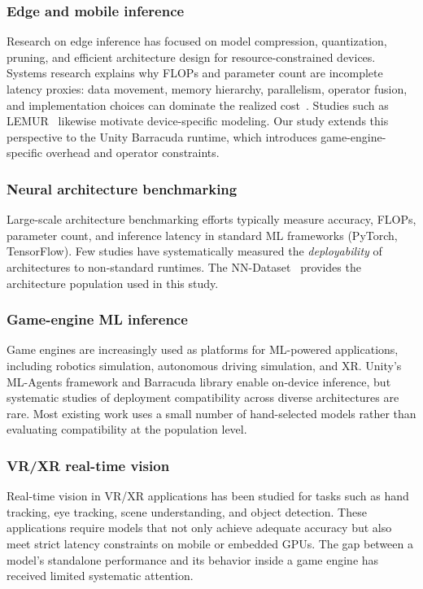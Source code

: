 \documentclass[10pt,twocolumn]{article}
\begin{document}
\subsubsection{Edge and mobile inference}

Research on edge inference has focused on model compression, quantization, pruning, and efficient architecture design for resource-constrained devices. Systems research explains why FLOPs and parameter count are incomplete latency proxies: data movement, memory hierarchy, parallelism, operator fusion, and implementation choices can dominate the realized cost~\cite{sze2017efficient}. Studies such as LEMUR~\cite{ABrain.LEMUR2} likewise motivate device-specific modeling. Our study extends this perspective to the Unity Barracuda runtime, which introduces game-engine-specific overhead and operator constraints.

\subsubsection{Neural architecture benchmarking}

Large-scale architecture benchmarking efforts typically measure accuracy, FLOPs, parameter count, and inference latency in standard ML frameworks (PyTorch, TensorFlow). Few studies have systematically measured the \emph{deployability} of architectures to non-standard runtimes. The NN-Dataset~\cite{ABrain.NN-Dataset} provides the architecture population used in this study.

\subsubsection{Game-engine ML inference}

Game engines are increasingly used as platforms for ML-powered applications, including robotics simulation, autonomous driving simulation, and XR. Unity's ML-Agents framework and Barracuda library enable on-device inference, but systematic studies of deployment compatibility across diverse architectures are rare. Most existing work uses a small number of hand-selected models rather than evaluating compatibility at the population level.

\subsubsection{VR/XR real-time vision}

Real-time vision in VR/XR applications has been studied for tasks such as hand tracking, eye tracking, scene understanding, and object detection. These applications require models that not only achieve adequate accuracy but also meet strict latency constraints on mobile or embedded GPUs. The gap between a model's standalone performance and its behavior inside a game engine has received limited systematic attention.
\end{document}
